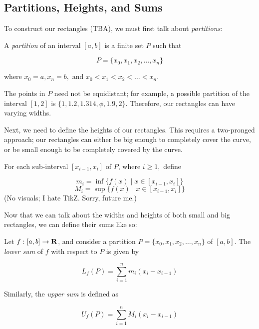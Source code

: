 \documentclass{article}
\begin{document}
      

  \subsection{Partitions, Heights, and Sums}
      To construct our rectangles (TBA), we must first talk about \emph{partitions}:

      \begin{defi}[Partitions]
        A \emph{partition} of an interval \([a,b]\) is a finite set \(P\) such that 

        \[
          P = \{x_0,x_1,x_2, \ldots, x_n\}
        \]
         
        \noindent
        where \(x_0 = a, x_n = b,\) and \(x_0 < x_1 < x_2 < \ldots < x_n.\)
      \end{defi}

      The points in \(P\) need not be equidistant; for example, a possible partition of the interval \([1,2]\) is \(\{1, 1.2, 1.314, \phi, 1.9, 2\}.\) Therefore, our rectangles can have varying widths.

      Next, we need to define the heights of our rectangles. This requires a two-pronged approach; our rectangles can either be big enough to completely cover the curve, or be small enough to be completely covered by the curve. 

      \begin{defi}
        For each sub-interval \([x_{i-1},x_i]\) of \(P\), where \(i \geq 1,\) define

        \[
          m_i = \inf\{f(x) \mid x \in [x_{i-1},x_i]\}
        \]
        \[
          M_i = \sup\{f(x) \mid x \in [x_{i-1},x_i]\}
        \]
        (No visuals; I hate TikZ. Sorry, future me.)
      \end{defi}

      Now that we can talk about the widths and heights of both small and big rectangles, we can define their sums like so:

      \begin{defi}
        Let \(f:[a,b] \to \mathbf{R}\), and consider a partition \(P = \{x_0,x_1,x_2, \ldots, x_n\}\) of \([a,b]\). The \emph{lower sum} of \(f\) with respect to \(P\) is given by

        \[
          L_f(P) = \sum_{i=1}^{n}{m_i(x_i-x_{i-1})}
        \]

        Similarly, the \emph{upper sum} is defined as 

        \[
          U_f(P) = \sum_{i=1}^{n}{M_i(x_i-x_{i-1})}
        \]
        
      \end{defi}
      
\end{document}

